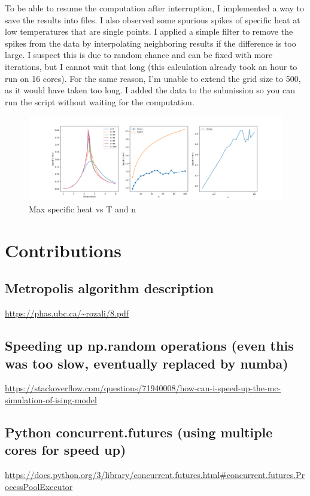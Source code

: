 \documentclass[11pt]{article}
\begin{document}
To be able to resume the computation after interruption, I implemented a way to save the results into files. I also observed some spurious spikes of specific heat at low temperatures that are single points. I applied a simple filter to remove the spikes from the data by interpolating neighboring results if the difference is too large. I suspect this is due to random chance and can be fixed with more iterations, but I cannot wait that long (this calculation already took an hour to run on 16 cores). For the same reason, I'm unable to extend the grid size to 500, as it would have taken too long. I added the data to the submission so you can run the script without waiting for the computation.

\begin{figure}[htbp]
\label{fig:2}
\centerline{\includegraphics[width=\textwidth]{ising-part2.png}}
\caption[]{Max specific heat vs T and n}
\end{figure}
\pagebreak
\section{Contributions}
\subsection*{Metropolis algorithm description}

\url{https://phas.ubc.ca/~rozali/8.pdf}

\subsection*{Speeding up np.random operations (even this was too slow, eventually replaced by numba)}

\url{https://stackoverflow.com/questions/71940008/how-can-i-speed-up-the-mc-simulation-of-ising-model}

\subsection*{Python concurrent.futures (using multiple cores for speed up)}
\url{https://docs.python.org/3/library/concurrent.futures.html#concurrent.futures.ProcessPoolExecutor}
\end{document}
